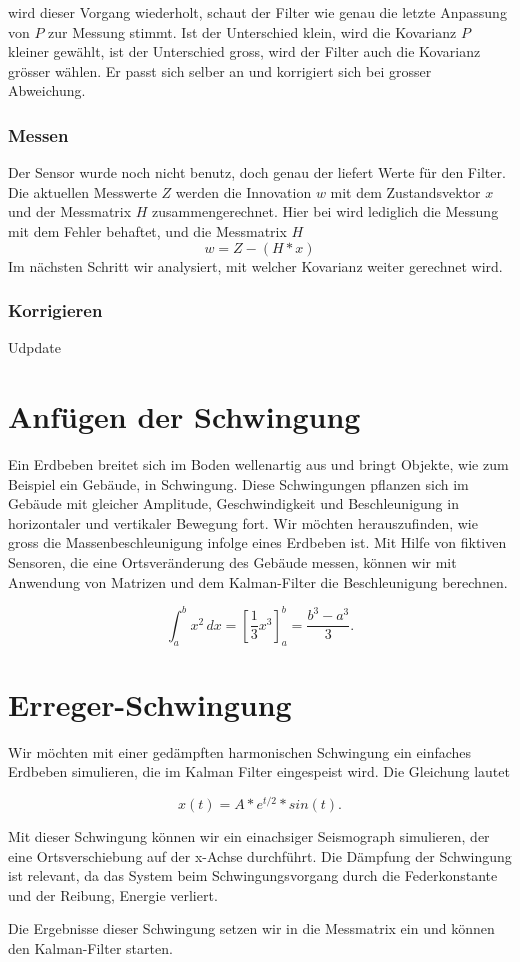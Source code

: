 \documentclass[11pt,a4paper]{article}
\begin{document}
wird dieser Vorgang wiederholt, schaut der Filter wie genau die letzte Anpassung von $P$ zur Messung stimmt. Ist der Unterschied klein, wird die Kovarianz $P$ kleiner gewählt, ist der Unterschied gross, wird der Filter auch die Kovarianz grösser wählen. Er passt sich selber an und korrigiert sich bei grosser Abweichung.

\subsubsection*{Messen}
Der Sensor wurde noch nicht benutz, doch genau der liefert Werte für den Filter. Die aktuellen Messwerte $Z$ werden die Innovation $w$ mit dem Zustandsvektor $x$ und der Messmatrix $H$ zusammengerechnet.
Hier bei wird lediglich die Messung mit dem Fehler behaftet, und die Messmatrix $H$ 
\begin{equation}
w=Z-(H*x)
\end{equation}
Im nächsten Schritt wir analysiert, mit welcher Kovarianz weiter gerechnet wird. 

\subsubsection*{Korrigieren}
Udpdate
\section{Anfügen der Schwingung}

Ein Erdbeben breitet sich im Boden wellenartig aus und bringt Objekte, wie zum Beispiel ein Gebäude, in Schwingung.
Diese Schwingungen pflanzen sich im Gebäude mit gleicher Amplitude, Geschwindigkeit und Beschleunigung in horizontaler und vertikaler Bewegung fort.
Wir möchten herauszufinden, wie gross die Massenbeschleunigung infolge eines Erdbeben ist.
Mit Hilfe von fiktiven Sensoren, die eine Ortsveränderung des Gebäude messen, können wir mit Anwendung von Matrizen und dem Kalman-Filter die Beschleunigung berechnen.

\begin{equation}
\int_a^b x^2\, dx
=
\left[ \frac13 x^3 \right]_a^b
=
\frac{b^3-a^3}3.
\label{erdbeben:equation1}
\end{equation}

\section{Erreger-Schwingung}
Wir möchten mit einer gedämpften harmonischen Schwingung ein einfaches Erdbeben simulieren, die im Kalman Filter eingespeist wird.
Die Gleichung lautet

\begin{equation}
x(t)=A*e^{t/2}*sin(t).
\end{equation}

Mit dieser Schwingung können wir ein einachsiger Seismograph simulieren, der eine Ortsverschiebung auf der x-Achse durchführt.
Die Dämpfung der Schwingung ist relevant, da das System beim Schwingungsvorgang durch die Federkonstante und der Reibung, Energie verliert.

Die Ergebnisse dieser Schwingung setzen wir in die Messmatrix ein und können den Kalman-Filter starten.
\end{document}
